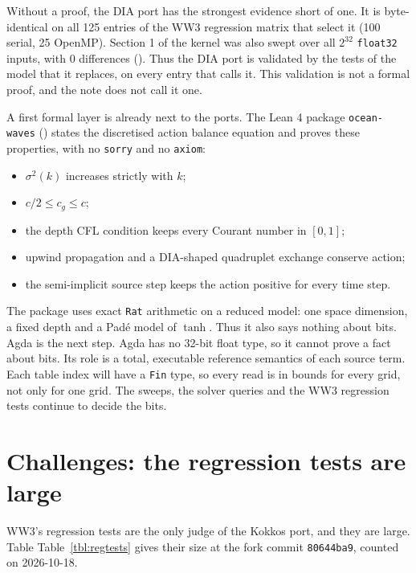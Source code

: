 \documentclass[10pt,a4paper,]{article}
\providecommand{\tightlist}{\setlength{\itemsep}{0pt}\setlength{\parskip}{0pt}}
\begin{document}
Without a proof, the DIA port has the strongest evidence short of one.
It is byte-identical on all 125 entries of the WW3 regression matrix
that select it (100 serial, 25 OpenMP). Section 1 of the kernel was also
swept over all \(2^{32}\) \texttt{float32} inputs, with 0 differences
(). Thus the DIA port is validated
by the tests of the model that it replaces, on every entry that calls
it. This validation is not a formal proof, and the note does not call it
one.

A first formal layer is already next to the ports. The Lean 4 package
\texttt{ocean-waves} () states
the discretised action balance equation and proves these properties,
with no \texttt{sorry} and no \texttt{axiom}:

\begin{itemize}
\tightlist
\item
  \(\sigma^2(k)\) increases strictly with \(k\);
\item
  \(c/2 \le c_g \le c\);
\item
  the depth CFL condition keeps every Courant number in \([0, 1]\);
\item
  upwind propagation and a DIA-shaped quadruplet exchange conserve
  action;
\item
  the semi-implicit source step keeps the action positive for every time
  step.
\end{itemize}

The package uses exact \texttt{Rat} arithmetic on a reduced model: one
space dimension, a fixed depth and a Padé model of \(\tanh\). Thus it
also says nothing about bits. Agda is the next step. Agda has no 32-bit
float type, so it cannot prove a fact about bits. Its role is a total,
executable reference semantics of each source term. Each table index
will have a \texttt{Fin} type, so every read is in bounds for every
grid, not only for one grid. The sweeps, the solver queries and the WW3
regression tests continue to decide the bits.

\section{Challenges: the regression tests are
large}\label{sec:challenges}

WW3's regression tests are the only judge of the Kokkos port, and they
are large. Table Table~\ref{tbl:regtests} gives their size at the fork
commit \texttt{80644ba9}, counted on 2026-10-18.
\end{document}
